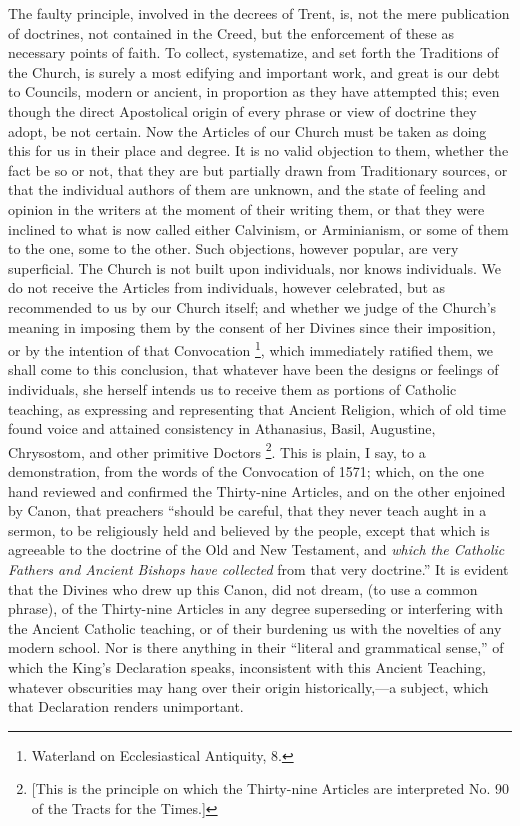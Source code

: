 The faulty principle, involved in the decrees of Trent, is, not the
mere publication of doctrines, not contained in the Creed, but the
enforcement of these as necessary points of faith. To collect,
systematize, and set forth the Traditions of the Church, is surely a
most edifying and important work, and great is our debt to Councils,
modern or ancient, in proportion as they have attempted this; even
though the direct Apostolical origin of every phrase or view of
doctrine they adopt, be not certain. Now the Articles of our Church
must be taken as doing this for us in their place and degree. It is no
valid objection to them, whether the fact be so or not, that they are
but partially drawn from Traditionary sources, or that the individual
authors of them are unknown, and the state of feeling and opinion in
the writers at the moment of their writing them, or that they were
inclined to what is now called either Calvinism, or Arminianism, or
some of them to the one, some to the other. Such objections, however
popular, are very superficial. The Church is not built upon
individuals, nor knows individuals. We do not receive the Articles
from individuals, however celebrated, but as recommended to us by our
Church itself; and whether we judge of the Church's meaning in
imposing them by the consent of her Divines since their imposition, or
by the intention of that Convocation \footnote{Waterland on Ecclesiastical Antiquity, 8.}, which immediately ratified them, we shall come to this
conclusion, that whatever have been the designs or feelings of
individuals, she herself intends us to receive them as portions of
Catholic teaching, as expressing and representing that Ancient
Religion, which of old time found voice and attained consistency in
Athanasius, Basil, Augustine, Chrysostom, and other primitive Doctors
\footnote{[This is the principle on which the
Thirty-nine Articles are interpreted No. 90 of the Tracts for the
Times.]}. This is plain, I say, to a demonstration, from the words of the
Convocation of 1571; which, on the one hand reviewed and confirmed the
Thirty-nine Articles, and on the other enjoined by Canon, that
preachers ``should be careful, that they never teach aught in a
sermon, to be religiously held and believed by the people, except that
which is agreeable to the doctrine of the Old and New Testament, and \emph{which
the Catholic Fathers and Ancient Bishops have collected} from that
very doctrine.'' It is evident that the Divines who drew up this
Canon, did not dream, (to use a common phrase), of the Thirty-nine
Articles in any degree superseding or interfering with the Ancient
Catholic teaching, or of their burdening us with the novelties of any
modern school. Nor is there anything in their ``literal and
grammatical sense,'' of which the King's Declaration speaks,
inconsistent with this Ancient Teaching, whatever obscurities may hang
over their origin historically,—a subject, which that Declaration
renders unimportant.

